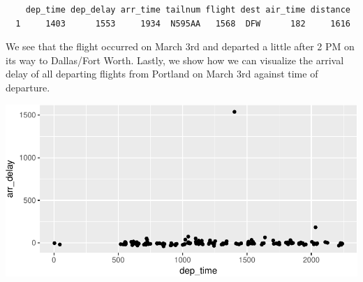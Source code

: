\documentclass[12pt,twoside]{reedthesis}
\begin{document}
  \begin{Shaded}
  \end{Shaded}
  
  \begin{verbatim}
    dep_time dep_delay arr_time tailnum flight dest air_time distance
  1     1403      1553     1934  N595AA   1568  DFW      182     1616
  \end{verbatim}
  
  We see that the flight occurred on March 3rd and departed a little after
  2 PM on its way to Dallas/Fort Worth. Lastly, we show how we can
  visualize the arrival delay of all departing flights from Portland on
  March 3rd against time of departure.
  
  \begin{Shaded}
  \end{Shaded}
  
  \begin{center}\includegraphics{tesis_files/figure-latex/march3plot-1} \end{center}
  
\end{document}
